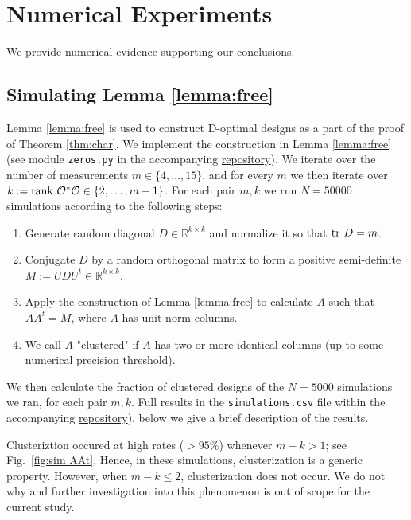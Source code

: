 \section{Numerical Experiments}
We provide numerical evidence supporting our conclusions.


\subsection{Simulating Lemma \ref{lemma:free}}\label{subsec:lemma sims}
Lemma \ref{lemma:free} is used to construct D-optimal designs as a
part of the proof of Theorem \ref{thm:char}. We implement the
construction in Lemma \ref{lemma:free} (see module \texttt{zeros.py}
in the accompanying
\href{https://github.com/yairdaon/OED}{repository}). We iterate over
the number of measurements $m \in \{4,\dots, 15\}$, and for every $m$
we then iterate over $k:=\textup{rank}\  \mathcal{O}^*\mathcal{O} \in \{2,\dots, m-1\}$. For
each pair $m,k$ we run $N=50000$ simulations according to the
following steps:
\begin{enumerate}
\item Generate random diagonal $D\in \mathbb{R}^{k\times k}$ and
  normalize it so that $\textup{tr}\ D = m$.
\item Conjugate $D$ by a random orthogonal matrix to form a positive
  semi-definite $M := UDU^t \in \mathbb{R}^{k\times k}$.
\item Apply the construction of Lemma \ref{lemma:free} to calculate
  $A$ such that $AA^t = M$, where $A$ has unit norm columns.
\item We call $A$ "clustered" if $A$ has two or more identical columns
  (up to some numerical precision threshold).
\end{enumerate}
We then calculate the fraction of clustered designs of the $N=5000$
simulations we ran, for each pair $m,k$. Full results in the
\texttt{simulations.csv} file within the accompanying
\href{https://github.com/yairdaon/OED}{repository}), below we give a
brief description of the results.

Clusteriztion occured at high rates ($>95\%$) whenever $m-k > 1$; see
Fig.~\ref{fig:sim AAt}. Hence, in these simulations, clusterization is
a generic property. However, when $m-k \leq 2$, clusterization does
not occur. We do not why and further investigation into this
phenomenon is out of scope for the current study.

